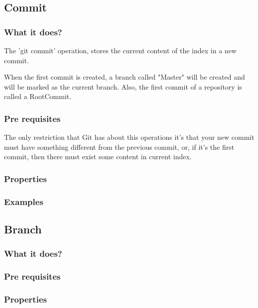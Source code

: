 \pagebreak


\subsection{Commit}

\subsubsection{What it does?}

The 'git commit' operation, stores the current content of the index in a new
commit. \par
When the first commit is created, a branch called "Master" will be created
and will be marked as the current branch. Also, the first commit of a repository
is called a RootCommit. \par

\subsubsection{Pre requisites}

The only restriction that Git has about this operations 
it's that your new commit must have something different from the previous
commit, or, if it's the first commit, then there must exist some content in
current index. \par

\subsubsection{Properties}

\subsubsection{Examples}


\subsection{Branch}

\subsubsection{What it does?}
\subsubsection{Pre requisites}
\subsubsection{Properties}
